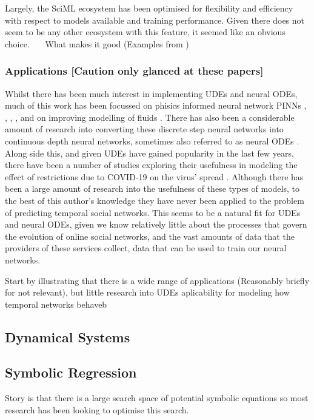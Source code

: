 \documentclass[12pt]{article}
\begin{document}
     Largely, the SciML ecosystem has been optimised for flexibility and efficiency with respect to models available 
     and training performance. Given there does not seem to be any other ecosystem with this feature, it seemed like 
     an obvious choice. ~~~What makes it good (Examples from \cite{SciML_C_Rak})  
    
    \subsubsection{Applications [Caution only glanced at these papers]}
    Whilst there has been much interest in implementing UDEs and neural ODEs, much of this work has been focussed on phisics informed neural network PINNs \cite{karniadakis2021physics}, \cite{GAO2021110079}, \cite{krishnapriyan2021characterizing}, \cite{roehrl2020modeling}, and on improving modelling of fluids \cite{mahmoudabadbozchelou2021data} \cite{nguyen2022physics}. There has also been a considerable amount of research into converting these discrete step neural networks into continuous depth neural networks, sometimes also referred to as neural ODEs \cite{massaroli2020dissecting} \cite{poli2019graph} \cite{NEURIPS2020_c9f2f917}. Along side this, and given UDEs have gained popularity in the last few years, there have been a number of studies exploring their usefulness in modeling the effect of restrictions due to COVID-19 on the virus' spread \cite{Dandekar2020.04.03.20052084}. Although there has been a large amount of research into the usefulness of these types of models, to the best of this author's knowledge they have never been applied to the problem of predicting temporal social networks. This seems to be a natural fit for UDEs and neural ODEs, given we know relatively little about the processes that govern the evolution of online social networks, and the vast amounts of data that the providers of these services collect, data that can be used to train our neural networks.

        
        
    
     Start by illustrating that there is a wide range of applications (Reasonably briefly for not relevant), but little research into UDEs aplicability for modeling how temporal networks behaveb
\subsection{Dynamical Systems}

\subsection{Symbolic Regression}
    Story is that there is a large search space of potential symbolic equations so most research has been looking to optimise this search. 
\end{document}
